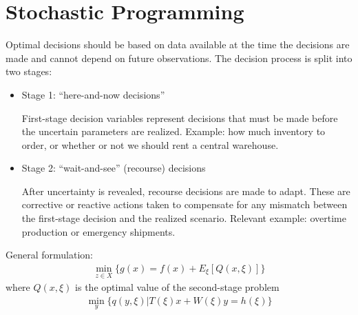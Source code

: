 \documentclass[10pt]{article}
\begin{document}
\section{Stochastic Programming}
Optimal decisions should be based on data available at the time the decisions are made and cannot depend on future observations. The decision process is split into two stages:
\begin{itemize}
    \item Stage 1: ``here-and-now decisions''

    First-stage decision variables represent decisions that must be made before the uncertain parameters are realized. Example: how much inventory to order, or whether or not we should rent a central warehouse.
    \item Stage 2: ``wait-and-see'' (recourse) decisions

    After uncertainty is revealed, recourse decisions are made to adapt. These are corrective or reactive actions taken to compensate for any mismatch between the first-stage decision and the realized scenario. Relevant example: overtime production or emergency shipments.
\end{itemize}
General formulation: 
\begin{gather*}
    \min_{z\in X}\{g(x) = f(x) + E_\xi[Q(x, \xi)]\}
\end{gather*}
where $Q(x, \xi)$ is the optimal value of the second-stage problem 
\begin{gather*}
    \min_y\{q(y, \xi)|T(\xi)x + W(\xi)y = h(\xi)\}
\end{gather*}
\end{document}
